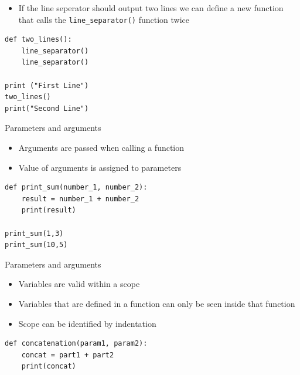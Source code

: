 \documentclass[10pt, a4paper]{beamer} %
\begin{document}
\begin{frame}
\framebreak

\begin{examples}
    \begin{itemize}
        \item If the line seperator should output two lines we can define a new function that calls the \lstinline!line_separator()! function twice
    \end{itemize}
    \begin{lstlisting}
def two_lines():
    line_separator()
    line_separator()

print ("First Line")
two_lines()
print("Second Line")       
    \end{lstlisting}
\end{examples}

\framebreak
\begin{block}{Parameters and arguments}
    \begin{itemize}
        \item Arguments are passed when calling a function
        \item Value of arguments is assigned to parameters
    \end{itemize}
    \begin{lstlisting}
def print_sum(number_1, number_2):
    result = number_1 + number_2
    print(result)

print_sum(1,3)
print_sum(10,5)
    \end{lstlisting}
\end{block}
\begin{block}{Parameters and arguments}
    \framebreak
    \begin{itemize}
        \item Variables are valid within a scope
        \item Variables that are defined in a function can only be seen inside that function
        \item Scope can be identified by indentation
    \end{itemize}
    \begin{lstlisting}
def concatenation(param1, param2):
    concat = part1 + part2
    print(concat)


\end{lstlisting}
\end{block}
\end{frame}
\end{document}
